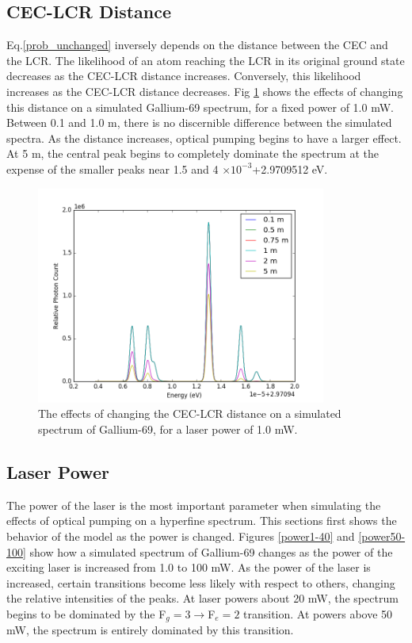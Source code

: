 \subsection{CEC-LCR Distance}
Eq.\ref{prob_unchanged} inversely depends on the distance between the CEC and the LCR. The likelihood of an atom reaching the LCR in its original ground state decreases as the CEC-LCR distance increases. Conversely, this likelihood increases as the CEC-LCR distance decreases. Fig \ref{CEC-LCR} shows the effects of changing this distance on a simulated Gallium-69 spectrum, for a fixed power of 1.0 mW. Between 0.1 and 1.0 m, there is no discernible difference between the simulated spectra. As the distance increases, optical pumping begins to have a larger effect. At 5 m, the central peak begins to completely dominate the spectrum at the expense of the smaller peaks near 1.5 and 4 $\times 10^{-3}$+2.9709512 eV.
\begin{figure}[h!]
\begin{center}
\includegraphics[width=0.85\textwidth]{Graphics/dist_comparison.png}
\end{center}
\caption[The effects of changing the CEC-LCR distance on a simulated spectrum of Gallium-69.]{\small The effects of changing the CEC-LCR distance on a simulated spectrum of Gallium-69, for a laser power of 1.0 mW.}
\label{CEC-LCR}
\end{figure}

\subsection{Laser Power}
The power of the laser is the most important parameter when simulating the effects of optical pumping on a hyperfine spectrum. This sections first shows the behavior of the model as the power is changed. Figures \ref{power1-40} and \ref{power50-100} show how a simulated spectrum of Gallium-69 changes as the power of the exciting laser is increased from 1.0 to 100 mW. As the power of the laser is increased, certain transitions become less likely with respect to others, changing the relative intensities of the peaks. At laser powers about 20 mW, the spectrum begins to be dominated by the F$_g = 3 \rightarrow$F$_e = 2$ transition. At powers above 50 mW, the spectrum is entirely dominated by this transition.

